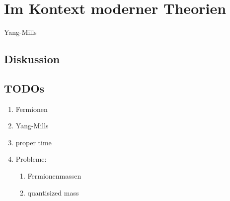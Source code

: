 \chapter{Im Kontext moderner Theorien}
Yang-Mills
\section{Diskussion}
\section{TODOs}
\begin{enumerate}
  \item Fermionen
  \item Yang-Mills
  \item proper time
  \item Probleme:
  \begin{enumerate}
    \item Fermionenmassen
    \item quantisized mass
    \end{enumerate}
\end{enumerate}